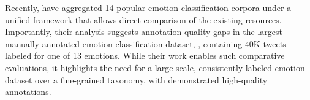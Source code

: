 \documentclass[11pt,a4paper]{article}
\begin{document}
Recently, \citet{unified-klinger2018analysis} have aggregated 14 popular emotion classification corpora under a unified framework that allows direct comparison of the existing resources. 
Importantly, their analysis suggests annotation quality gaps in the largest manually annotated emotion classification dataset, \citet{crowdflower-2016}, containing 40K tweets labeled for one of 13 emotions. While their work enables such comparative evaluations, it highlights the need for a large-scale, consistently labeled emotion dataset over a fine-grained taxonomy, with demonstrated high-quality annotations.

\begin{table}[t]
\centering
    
    \caption{Example annotations from our dataset.}
    \label{tab:intro_examples}
\end{table}
\end{document}
